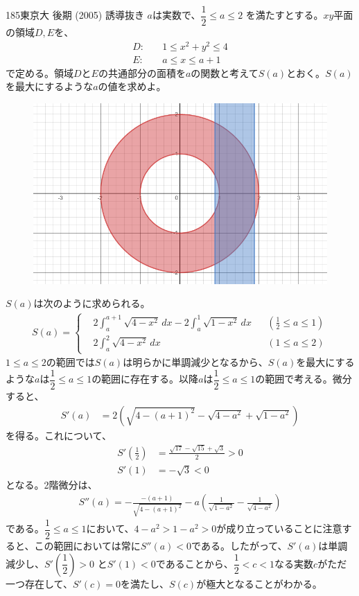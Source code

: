 \begin{thm}{185}{}{東京大 後期 (2005) 誘導抜き}
 $a$は実数で、$\dfrac{1}{2}\le a\le 2$ を満たすとする。$xy$平面の領域$D, E$を、
 \begin{align*}
  D:&\quad 1\le x^2+y^2 \le 4 \\
  E:&\quad a\le x \le a+1
 \end{align*}
 で定める。領域$D$と$E$の共通部分の面積を$a$の関数と考えて$S(a)$とおく。$S(a)$を最大にするような$a$の値を求めよ。
\end{thm}

\begin{figure}[H]
 \centering
 \includegraphics[width=0.8\linewidth]{../problems/Q_185/A_185.png}
\end{figure}

$S(a)$は次のように求められる。
\begin{align*}
 S(a)=\left\{
 \begin{aligned}
  &2\int_a^{a+1}\!\!\!\sqrt{4-x^2} \,dx - 2\int_a^1\!\!\sqrt{1-x^2} \,dx & &(\frac{1}{2}\le a\le 1) \\
  &2\int_a^2\!\!\sqrt{4-x^2} \,dx & &(1\le a\le 2)
  \end{aligned}
  \right.
\end{align*}
$1\le a\le 2$の範囲では$S(a)$は明らかに単調減少となるから、$S(a)$を最大にするような$a$は$\dfrac12\le a\le 1$の範囲に存在する。以降$a$は$\dfrac12\le a\le 1$の範囲で考える。微分すると、
\begin{align*}
 S'(a) &= 2\left(\sqrt{4-(a+1)^2}-\sqrt{4-a^2}+\sqrt{1-a^2}\right)
\end{align*}
を得る。これについて、
\begin{align*}
 S'\left(\frac{1}{2}\right)&=\frac{\sqrt{17}-\sqrt{15}+\sqrt{3}}{2} > 0 \\
 S'(1)&=-\sqrt{3} < 0
\end{align*}
となる。2階微分は、
\begin{align*}
 S''(a)=-\frac{-(a+1)}{\sqrt{4-(a+1)^2}}-a\left(\frac{1}{\sqrt{1-a^2}}-\frac{1}{\sqrt{4-a^2}}\right)
\end{align*}
である。$\dfrac{1}{2}\le a\le 1$において、$4-a^2>1-a^2>0$が成り立っていることに注意すると、この範囲においては常に$S''(a)<0$である。したがって、$S'(a)$は単調減少し、$S'\left(\dfrac{1}{2}\right)>0$ と$S'(1)<0$であることから、$\dfrac{1}{2}<c<1$なる実数$c$がただ一つ存在して、$S'(c)=0$を満たし、$S(c)$が極大となることがわかる。

